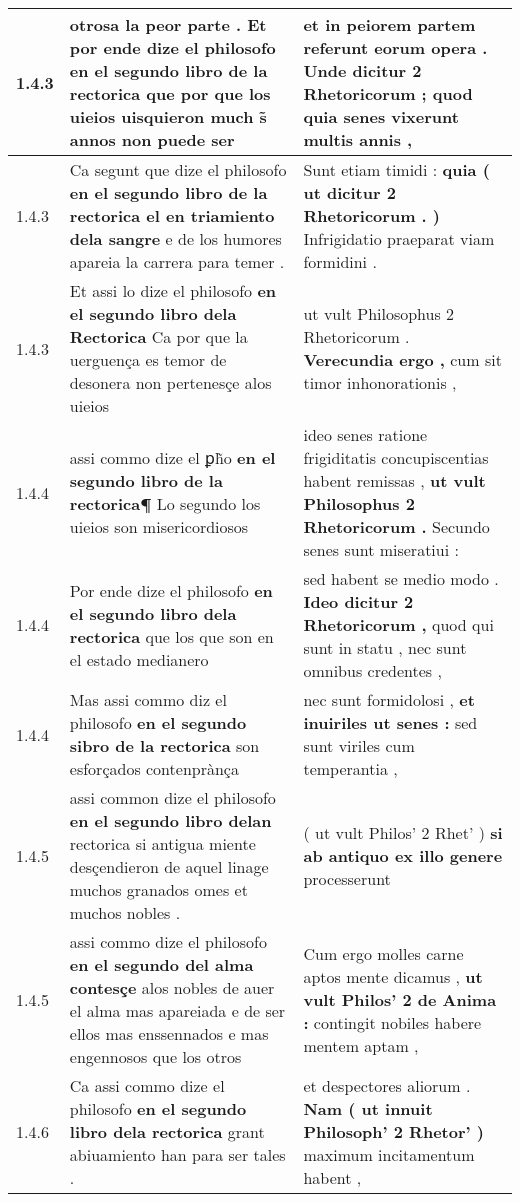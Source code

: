 \begin{tabular}{|p{1cm}|p{6.5cm}|p{6.5cm}|}
1.4.3 & otrosa la peor parte . Et por ende dize el philosofo \textbf{ en el segundo libro de la rectorica } que por que los uieios uisquieron much s̃ annos non puede ser & et in peiorem partem referunt eorum opera . \textbf{ Unde dicitur 2 Rhetoricorum ; } quod quia senes vixerunt multis annis , \\\hline
1.4.3 & Ca segunt que dize el philosofo \textbf{ en el segundo libro de la rectorica el en triamiento dela sangre } e de los humores apareia la carrera para temer . & Sunt etiam timidi : \textbf{ quia ( ut dicitur 2 Rhetoricorum . ) } Infrigidatio praeparat viam formidini . \\\hline
1.4.3 & Et assi lo dize el philosofo \textbf{ en el segundo libro dela Rectorica } Ca por que la uerguença es temor de desonera non pertenesçe alos uieios & ut vult Philosophus 2 Rhetoricorum . \textbf{ Verecundia ergo , } cum sit timor inhonorationis , \\\hline
1.4.4 & assi commo dize el ꝑh̃o \textbf{ en el segundo libro de la rectorica¶ } Lo segundo los uieios son misericordiosos & ideo senes ratione frigiditatis concupiscentias habent remissas , \textbf{ ut vult Philosophus 2 Rhetoricorum . } Secundo senes sunt miseratiui : \\\hline
1.4.4 & Por ende dize el philosofo \textbf{ en el segundo libro dela rectorica } que los que son en el estado medianero & sed habent se medio modo . \textbf{ Ideo dicitur 2 Rhetoricorum , } quod qui sunt in statu , nec sunt omnibus credentes , \\\hline
1.4.4 & Mas assi commo diz el philosofo \textbf{ en el segundo sibro de la rectorica } son esforçados contenprànça & nec sunt formidolosi , \textbf{ et inuiriles ut senes : } sed sunt viriles cum temperantia , \\\hline
1.4.5 & assi common dize el philosofo \textbf{ en el segundo libro delan } rectorica si antigua miente desçendieron de aquel linage muchos granados omes et muchos nobles . & ( ut vult Philos’ 2 Rhet’ ) \textbf{ si ab antiquo ex illo genere } processerunt \\\hline
1.4.5 & assi commo dize el philosofo \textbf{ en el segundo del alma contesçe } alos nobles de auer el alma mas apareiada e de ser ellos mas enssennados e mas engennosos que los otros & Cum ergo molles carne aptos mente dicamus , \textbf{ ut vult Philos’ 2 de Anima : } contingit nobiles habere mentem aptam , \\\hline
1.4.6 & Ca assi commo dize el philosofo \textbf{ en el segundo libro dela rectorica } grant abiuamiento han para ser tales . & et despectores aliorum . \textbf{ Nam ( ut innuit Philosoph’ 2 Rhetor’ ) } maximum incitamentum habent , \\\hline

\end{tabular}
